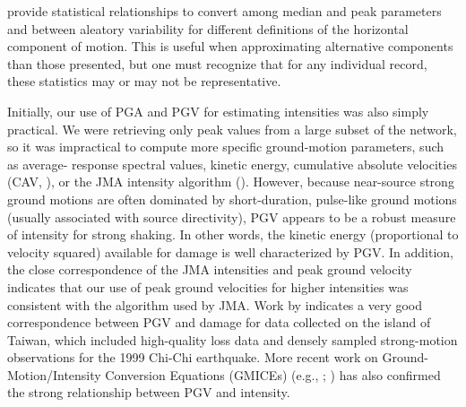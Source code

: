 \documentclass[letterpaper,10pt,english]{sphinxmanual}
\begin{document}
{\hyperref[references:beyer2006]{}} provide statistical relationships
to convert among median and
peak parameters and between aleatory variability for different definitions of the
horizontal component of motion. This is useful when approximating alternative
components than those presented, but one must recognize that for any individual record,
these statistics may or may not be representative.

Initially, our use of PGA and PGV for estimating intensities was also simply practical.
We were retrieving only peak values from a large subset of the network, so it was
impractical to compute more specific ground-motion parameters, such as average-
response spectral values, kinetic energy, cumulative absolute velocities (CAV, {\hyperref[references:epri1991]{}}), or the JMA intensity algorithm ({\hyperref[references:jma1996]{}}). However, because
near-source strong ground motions are often dominated by short-duration, pulse-like
ground motions (usually associated with source directivity), PGV appears to be a robust measure
of intensity for strong shaking. In other words, the kinetic energy (proportional to
velocity squared) available for damage is well characterized by PGV. In addition, the
close correspondence of the JMA intensities and peak ground velocity
indicates that our use of peak ground velocities for higher intensities was
consistent with the algorithm used by JMA. Work by {\hyperref[references:wu2003]{}} indicates a very
good correspondence between PGV and damage for data collected on the island of Taiwan,
which included high-quality loss data and densely sampled strong-motion observations
for the 1999 Chi-Chi earthquake. More recent work on Ground-Motion/Intensity
Conversion Equations (GMICEs) (e.g., {\hyperref[references:atkinson2007]{}}; {\hyperref[references:worden2012]{}}) has also
confirmed the strong relationship between PGV and intensity.
\end{document}
